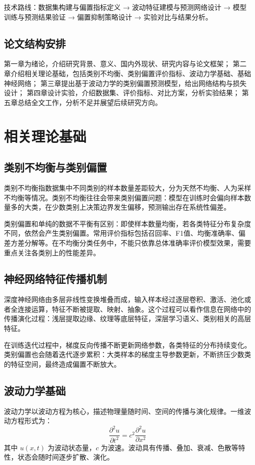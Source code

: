 \documentclass{article}
\begin{document}
技术路线：数据集构建与偏置指标定义 → 波动特征建模与预测网络设计 → 模型训练与预测结果验证 → 偏置抑制策略设计 → 实验对比与结果分析。

\subsection{论文结构安排}
第一章为绪论，介绍研究背景、意义、国内外现状、研究内容与论文框架；
第二章介绍相关理论基础，包括类别不均衡、类别偏置评价指标、波动力学基础、基础神经网络；
第三章提出基于波动力学的类别偏置预测模型，给出网络结构与损失设计；
第四章设计实验，介绍数据集、评价指标、对比方案，分析实验结果；
第五章总结全文工作，分析不足并展望后续研究方向。

\section{相关理论基础}
\subsection{类别不均衡与类别偏置}
类别不均衡指数据集中不同类别的样本数量差距较大，分为天然不均衡、人为采样不均衡等情况。类别不均衡往往会带来类别偏置问题：模型在训练时会偏向样本数量多的大类，在少数类别上决策边界发生偏移，预测输出存在系统性偏差。

类别偏置和单纯的数据不平衡有区别：即使样本数量均衡，若各类特征分布复杂度不同，依然会产生类别偏置。常用评价指标包括召回率、F1值、均衡准确率、偏差方差分解等。在不均衡分类任务中，不能只依靠总体准确率评价模型效果，需要重点关注各类别上的性能差异。

\subsection{神经网络特征传播机制}
深度神经网络由多层非线性变换堆叠而成，输入样本经过逐层卷积、激活、池化或者全连接运算，特征不断被提取、映射、抽象。这个过程可以看作信息在网络中的传播演化过程：浅层提取边缘、纹理等底层特征，深层学习语义、类别相关的高层特征。

在训练迭代过程中，梯度反向传播不断更新网络参数，各类特征的分布持续变化。类别偏置也会随着迭代逐步累积：大类样本的梯度主导参数更新，不断挤压少数类的特征空间，最终造成偏置不断放大。

\subsection{波动力学基础}
波动力学以波动方程为核心，描述物理量随时间、空间的传播与演化规律。一维波动方程形式为：
\[
\frac{\partial^2 u}{\partial t^2}=c^2\frac{\partial^2 u}{\partial x^2}
\]
其中 \(u(x,t)\) 为波动状态量，\(c\) 为波速。波动具有传播、叠加、衰减、色散等特性，状态会随时间逐步扩散、演化。
\end{document}
